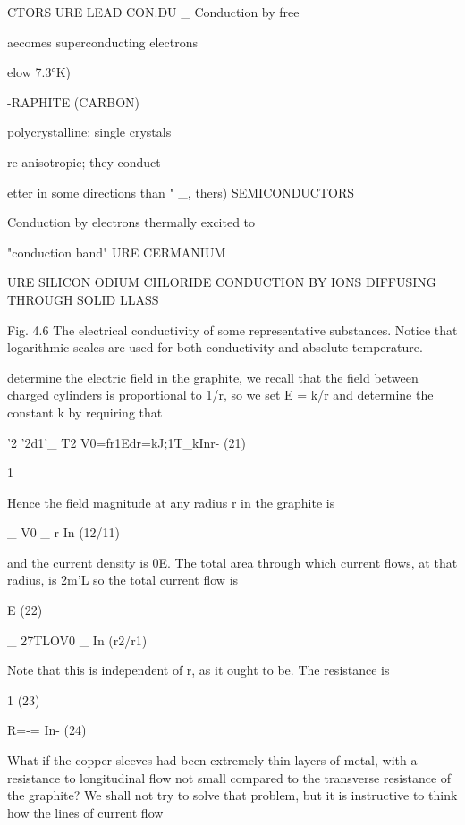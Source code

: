 CTORS
URE LEAD CON.DU
_ Conduction by free

aecomes superconducting electrons

elow 7.3°K)

-RAPHITE (CARBON)

polycrystalline; single crystals

re anisotropic; they conduct

etter in some directions than " _,
thers) SEMICONDUCTORS

Conduction by electrons
thermally excited to

"conduction band"
URE CERMANIUM

URE SILICON
ODIUM
CHLORIDE CONDUCTION BY
IONS DIFFUSING
THROUGH SOLID
LLASS

Fig. 4.6 The electrical conductivity of some representative
substances. Notice that logarithmic scales are used for both
conductivity and absolute temperature.

determine the electric field in the graphite, we recall that the field
between charged cylinders is proportional to 1/r, so we set E = k/r
and determine the constant k by requiring that

'2 '2d1'_ T2
V0=fr1Edr=kJ;1T_kInr- (21)
\begin{equation}
\end{equation}

1

Hence the field magnitude at any radius r in the graphite is

_ V0
_ r In (12/11)

and the current density is 0E. The total area through which current
flows, at that radius, is 2m'L so the total current flow is

E (22)
\begin{equation}
\end{equation}

_ 27TLOV0
_ In (r2/r1)

Note that this is independent of r, as it ought to be. The resistance
is

1 (23)
\begin{equation}
\end{equation}

R=-= In- (24)
\begin{equation}
\end{equation}

What if the copper sleeves had been extremely thin layers of metal,
with a resistance to longitudinal flow not small compared to the
transverse resistance of the graphite? We shall not try to solve that
problem, but it is instructive to think how the lines of current flow

